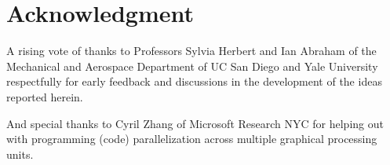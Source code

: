 \section{Acknowledgment}
A rising vote of thanks to Professors Sylvia Herbert and Ian Abraham of the Mechanical and Aerospace Department of UC San Diego and Yale University respectfully for early feedback and discussions in the development of the ideas reported herein. 

And special thanks to Cyril Zhang of Microsoft Research NYC for helping out with programming (code) parallelization across multiple graphical processing units.